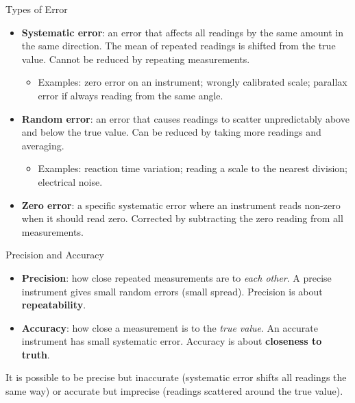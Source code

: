 \begin{definitionbox}{Types of Error}
\begin{itemize}[itemsep=4pt]
  \item \textbf{Systematic error}: an error that affects all readings by the same amount in the same direction. The mean of repeated readings is shifted from the true value. Cannot be reduced by repeating measurements.
  \begin{itemize}
    \item Examples: zero error on an instrument; wrongly calibrated scale; parallax error if always reading from the same angle.
  \end{itemize}
  \item \textbf{Random error}: an error that causes readings to scatter unpredictably above and below the true value. Can be reduced by taking more readings and averaging.
  \begin{itemize}
    \item Examples: reaction time variation; reading a scale to the nearest division; electrical noise.
  \end{itemize}
  \item \textbf{Zero error}: a specific systematic error where an instrument reads non-zero when it should read zero. Corrected by subtracting the zero reading from all measurements.
\end{itemize}
\end{definitionbox}

\begin{definitionbox}{Precision and Accuracy}
\begin{itemize}[itemsep=4pt]
  \item \textbf{Precision}: how close repeated measurements are to \emph{each other}. A precise instrument gives small random errors (small spread). Precision is about \textbf{repeatability}.
  \item \textbf{Accuracy}: how close a measurement is to the \emph{true value}. An accurate instrument has small systematic error. Accuracy is about \textbf{closeness to truth}.
\end{itemize}
It is possible to be precise but inaccurate (systematic error shifts all readings the same way) or accurate but imprecise (readings scattered around the true value).
\end{definitionbox}

